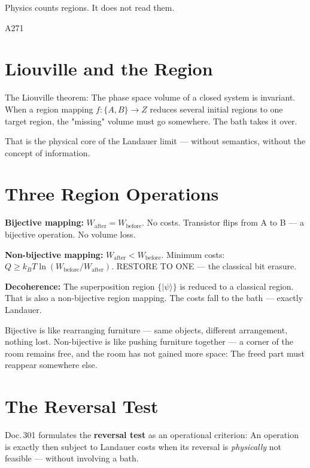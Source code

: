 \label{ch:landauer_phasenraum}

\epigraph{Physics counts regions. It does not read them.}{A271}

\section{Liouville and the Region}

The Liouville theorem: The phase space volume of a closed system
is invariant. When a region mapping $f: \{A, B\} \to Z$ reduces several
initial regions to one target region, the "missing" volume must go
somewhere. The bath takes it over. 

That is the physical core of the Landauer limit --- without semantics,
without the concept of information.

\section{Three Region Operations}

\textbf{Bijective mapping:} $W_{\text{after}} = W_{\text{before}}$.
No costs. Transistor flips from A to B --- a bijective operation.
No volume loss. 

\textbf{Non-bijective mapping:} $W_{\text{after}} < W_{\text{before}}$.
Minimum costs: $Q \ge k_BT \ln(W_{\text{before}}/W_{\text{after}})$.
RESTORE TO ONE --- the classical bit erasure. 

\textbf{Decoherence:} The superposition region $\{|\psi\rangle\}$ is
reduced to a classical region. That is also a non-bijective
region mapping. The costs fall to the bath --- exactly Landauer. 

\begin{laierspur}
Bijective is like rearranging furniture --- same objects,
different arrangement, nothing lost. Non-bijective is like pushing furniture
together --- a corner of the room remains free, and the room
has not gained more space: The freed part
must reappear somewhere else.
\end{laierspur}

\section{The Reversal Test}

Doc.\,301 formulates the \textbf{reversal test} as an operational criterion:
An operation is exactly then subject to Landauer costs when its reversal
is \emph{physically} not feasible --- without involving a bath.


